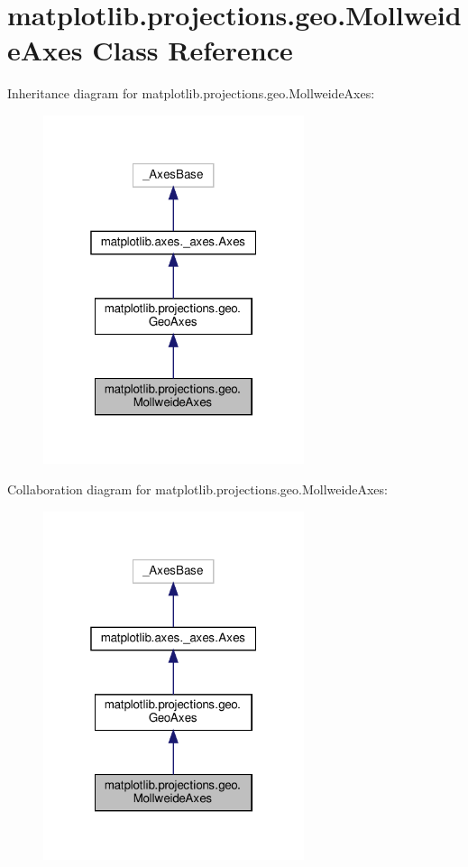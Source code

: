 \hypertarget{classmatplotlib_1_1projections_1_1geo_1_1MollweideAxes}{}\section{matplotlib.\+projections.\+geo.\+Mollweide\+Axes Class Reference}
\label{classmatplotlib_1_1projections_1_1geo_1_1MollweideAxes}


Inheritance diagram for matplotlib.\+projections.\+geo.\+Mollweide\+Axes\+:
\nopagebreak
\begin{figure}[H]
\begin{center}
\leavevmode
\includegraphics[width=217pt]{classmatplotlib_1_1projections_1_1geo_1_1MollweideAxes__inherit__graph}
\end{center}
\end{figure}


Collaboration diagram for matplotlib.\+projections.\+geo.\+Mollweide\+Axes\+:
\nopagebreak
\begin{figure}[H]
\begin{center}
\leavevmode
\includegraphics[width=217pt]{classmatplotlib_1_1projections_1_1geo_1_1MollweideAxes__coll__graph}
\end{center}
\end{figure}
